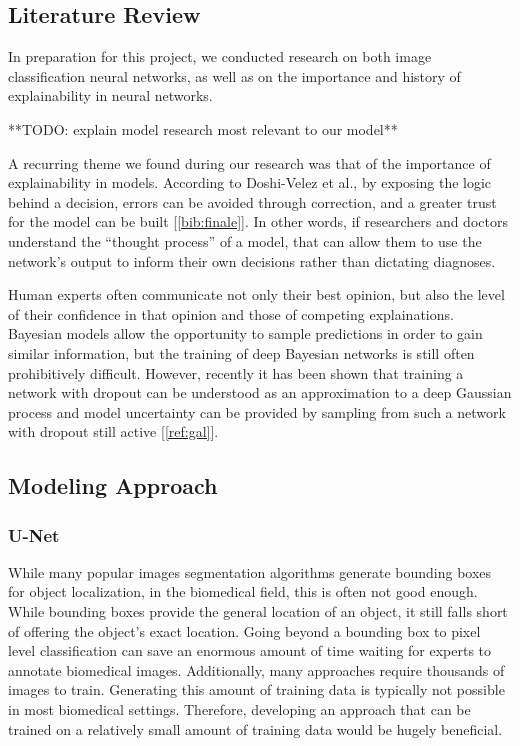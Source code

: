 \documentclass[12pt]{article}
\begin{document}
{\subsection*{Literature Review}

In preparation for this project, we conducted research on both image classification neural networks, as well as on the importance and history of explainability in neural networks.

**TODO: explain model research most relevant to our model**

A recurring theme we found during our research was that of the importance of explainability in models. According to Doshi-Velez et al., by exposing the logic behind a decision, errors can be avoided through correction, and a greater trust for the model can be built [\ref{bib:finale}]. In other words, if researchers and doctors understand the ``thought process'' of a model,  that can allow them to use the network's output to inform their own decisions rather than dictating diagnoses. 

Human experts often communicate not only their best opinion, but also the level of their confidence in that opinion and those of competing explainations. Bayesian models allow the opportunity to sample predictions in order to gain similar information, but the training of deep Bayesian networks is still often prohibitively difficult. However, recently it has been shown that training a network with dropout can be understood as an approximation to a deep Gaussian process and model uncertainty can be provided by sampling from such a network with dropout still active {[}\ref{ref:gal}{]}.

\subsection*{Modeling Approach}

\subsubsection*{U-Net}
While many popular images segmentation algorithms generate bounding boxes for object localization, in the biomedical field, this is often not good enough. While bounding boxes provide the general location of an object, it still falls short of offering the object's exact location. Going beyond a bounding box to pixel level classification can save an enormous amount of time waiting for experts to annotate biomedical images. Additionally, many approaches require thousands of images to train. Generating this amount of training data is typically not possible in most biomedical settings. Therefore, developing an approach that can be trained on a relatively small amount of training data would be hugely beneficial.  

}
\end{document}
